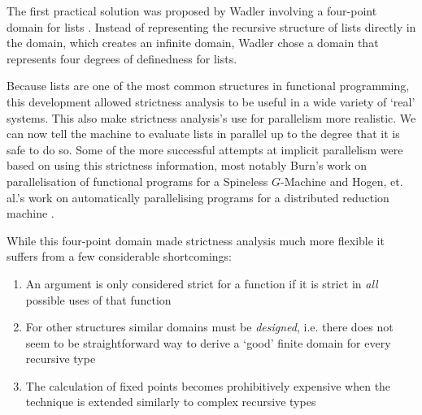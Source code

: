 The first practical solution was proposed by Wadler involving a four-point
domain for lists \citep{wadler1987strictness}. Instead of representing
the recursive structure of lists directly in the domain, which creates
an infinite domain, Wadler chose a domain that represents four degrees
of definedness for lists.


Because lists are one of the most common structures in functional programming,
this development allowed strictness analysis to be useful in a wide variety of
`real' systems. This also make strictness analysis's use for parallelism more
realistic. We can now tell the machine to evaluate lists in parallel up to the
degree that it is safe to do so. Some of the more successful attempts at
implicit parallelism were based on using this strictness information, most
notably Burn's work on parallelisation of functional programs for a Spineless
$G$-Machine  and Hogen, et. al.'s work on automatically
parallelising programs for a distributed reduction machine
\citep{hogen1992automatic}.

While this four-point domain made strictness analysis much more flexible it
suffers from a few considerable shortcomings:

\begin{enumerate}
    \item An argument is only considered strict for a function if it is strict
        in \emph{all} possible uses of that function
    \item For other structures similar domains must be \emph{designed}, i.e.
        there does not seem to be straightforward way to derive a `good' finite
        domain for every recursive type
    \item The calculation of fixed points becomes prohibitively expensive when
        the technique is extended similarly to complex recursive types
\end{enumerate}
